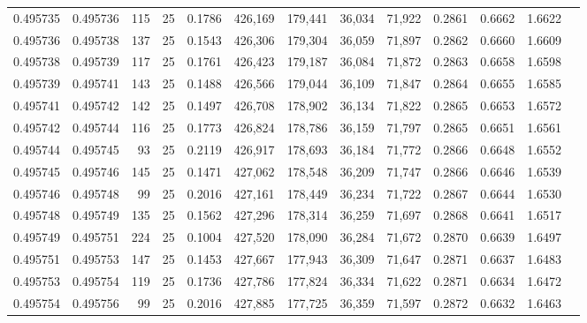 \begin{tabular}{rrrrrrrrrrrrr}
0.495735 & 0.495736 &   115 &  25 &                                     0.1786 & 426,169 & 179,441 &  36,034 &  71,922 & 0.2861 & 0.6662 & 1.6622 \\
0.495736 & 0.495738 &   137 &  25 &                                     0.1543 & 426,306 & 179,304 &  36,059 &  71,897 & 0.2862 & 0.6660 & 1.6609 \\
0.495738 & 0.495739 &   117 &  25 &                                     0.1761 & 426,423 & 179,187 &  36,084 &  71,872 & 0.2863 & 0.6658 & 1.6598 \\
0.495739 & 0.495741 &   143 &  25 &                                     0.1488 & 426,566 & 179,044 &  36,109 &  71,847 & 0.2864 & 0.6655 & 1.6585 \\
0.495741 & 0.495742 &   142 &  25 &                                     0.1497 & 426,708 & 178,902 &  36,134 &  71,822 & 0.2865 & 0.6653 & 1.6572 \\
0.495742 & 0.495744 &   116 &  25 &                                     0.1773 & 426,824 & 178,786 &  36,159 &  71,797 & 0.2865 & 0.6651 & 1.6561 \\
0.495744 & 0.495745 &    93 &  25 &                                     0.2119 & 426,917 & 178,693 &  36,184 &  71,772 & 0.2866 & 0.6648 & 1.6552 \\
0.495745 & 0.495746 &   145 &  25 &                                     0.1471 & 427,062 & 178,548 &  36,209 &  71,747 & 0.2866 & 0.6646 & 1.6539 \\
0.495746 & 0.495748 &    99 &  25 &                                     0.2016 & 427,161 & 178,449 &  36,234 &  71,722 & 0.2867 & 0.6644 & 1.6530 \\
0.495748 & 0.495749 &   135 &  25 &                                     0.1562 & 427,296 & 178,314 &  36,259 &  71,697 & 0.2868 & 0.6641 & 1.6517 \\
0.495749 & 0.495751 &   224 &  25 &                                     0.1004 & 427,520 & 178,090 &  36,284 &  71,672 & 0.2870 & 0.6639 & 1.6497 \\
0.495751 & 0.495753 &   147 &  25 &                                     0.1453 & 427,667 & 177,943 &  36,309 &  71,647 & 0.2871 & 0.6637 & 1.6483 \\
0.495753 & 0.495754 &   119 &  25 &                                     0.1736 & 427,786 & 177,824 &  36,334 &  71,622 & 0.2871 & 0.6634 & 1.6472 \\
0.495754 & 0.495756 &    99 &  25 &                                     0.2016 & 427,885 & 177,725 &  36,359 &  71,597 & 0.2872 & 0.6632 & 1.6463 \\

\end{tabular}
